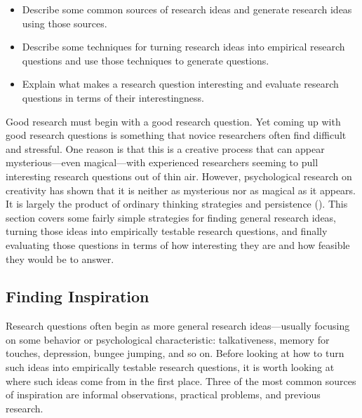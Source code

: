 \documentclass[
]{krantz}
\providecommand{\tightlist}{%
  \setlength{\itemsep}{0pt}\setlength{\parskip}{0pt}}
\begin{document}
\begin{itemize}
\tightlist
\item
  Describe some common sources of research ideas and generate research ideas using those sources.
\item
  Describe some techniques for turning research ideas into empirical research questions and use those techniques to generate questions.
\item
  Explain what makes a research question interesting and evaluate research questions in terms of their interestingness.
\end{itemize}

Good research must begin with a good research question. Yet coming up with good research questions is something that novice researchers often find difficult and stressful. One reason is that this is a creative process that can appear mysterious---even magical---with experienced researchers seeming to pull interesting research questions out of thin air. However, psychological research on creativity has shown that it is neither as mysterious nor as magical as it appears. It is largely the product of ordinary thinking strategies and persistence (). This section covers some fairly simple strategies for finding general research ideas, turning those ideas into empirically testable research questions, and finally evaluating those questions in terms of how interesting they are and how feasible they would be to answer.

\subsection*{Finding Inspiration}\label{finding-inspiration}


Research questions often begin as more general research ideas---usually focusing on some behavior or psychological characteristic: talkativeness, memory for touches, depression, bungee jumping, and so on. Before looking at how to turn such ideas into empirically testable research questions, it is worth looking at where such ideas come from in the first place. Three of the most common sources of inspiration are informal observations, practical problems, and previous research.
\end{document}
